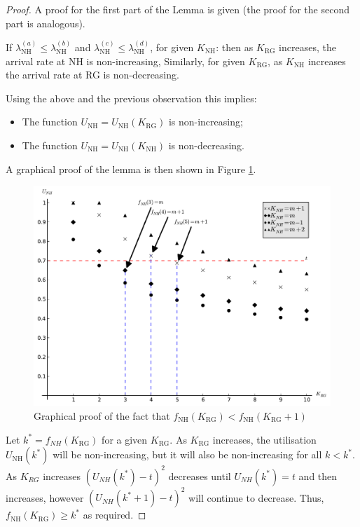 \documentclass{article}
\newcommand{\NH}{\text{NH}}
\newcommand{\RG}{\text{RG}}
\begin{document}
\begin{proof}

A proof for the first part of the Lemma is given (the proof for the second part is analogous).

If $\lambda_{\NH}^{(a)}\leq \lambda_{\NH}^{(b)}$ and $\lambda_{\NH}^{(c)}\leq \lambda_{\NH}^{(d)}$, for given $K_{\NH}$: then as $K_{\RG}$ increases, the arrival rate at NH is non-increasing,
Similarly, for given $K_{{\RG}}$, as $K_{\NH}$ increases the arrival rate at RG is non-decreasing.

Using the above and the previous observation this implies:

\begin{itemize}
    \item The function $U_{\NH}=U_{\NH}(K_{\RG})$ is non-increasing;
    \item The function $U_{\NH}=U_{\NH}(K_{\NH})$ is non-decreasing.
\end{itemize}

A graphical proof of the lemma is then shown in Figure \ref{proof}.

\begin{figure}[!hbtp]
\begin{center}
\includegraphics[width=.7\textwidth]{./Images/proof.pdf}
\end{center}
\caption{Graphical proof of the fact that $f_{\NH}(K_{\RG})<f_{\NH}(K_{\RG}+1)$}\label{proof}
\end{figure}

Let $k^*=f_{NH}(K_{\RG})$ for a given $K_{\RG}$.
As $K_{\RG}$ increases, the utilisation $U_{\NH}(k^*)$ will be non-increasing, but it will also be non-increasing for all $k<k^*$.
As $K_{RG}$ increases $\left(U_{NH}(k^*)-t\right)^2$ decreases until $U_{NH}(k^*)=t$ and then increases, however $\left(U_{NH}(k^*+1)-t\right)^2$ will continue to decrease.
Thus, $f_{\NH}(K_{\RG})\geq k^*$ as required.
\end{proof}
\end{document}

